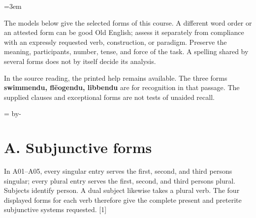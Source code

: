 \BookRecto
\begingroup
\renewcommand{\runningtitle}{Unit 7. Answer key}
\emergencystretch=3em
\newcommand{\itempara}[2]{\par\addvspace{3pt}\noindent\hangindent=1.8em\hangafter=1\makebox[1.8em][l]{#1.}#2\par}
\newcommand{\reserve}[1]{\par\penalty-100\begingroup\dimen0=\pagegoal\advance\dimen0 by-\pagetotal\ifdim\dimen0<#1\newpage\fi\endgroup}

\raggedright
{}

The models below give the selected forms of this course. A different word order or an attested form can be good Old English; assess it separately from compliance with an expressly requested verb, construction, or paradigm. Preserve the meaning, participants, number, tense, and force of the task. A spelling shared by several forms does not by itself decide its analysis.

In the source reading, the printed help remains available. The three forms \textbf{swimmendu, flēogendu, libbendu} are for recognition in that passage. The supplied clauses and exceptional forms are not tests of unaided recall.

\reserve{7\baselineskip}
\section*{A. Subjunctive forms}

In A01–A05, every singular entry serves the first, second, and third persons singular; every plural entry serves the first, second, and third persons plural. Subjects identify person. A dual subject likewise takes a plural verb. The four displayed forms for each verb therefore give the complete present and preterite subjunctive systems requested. [1]

